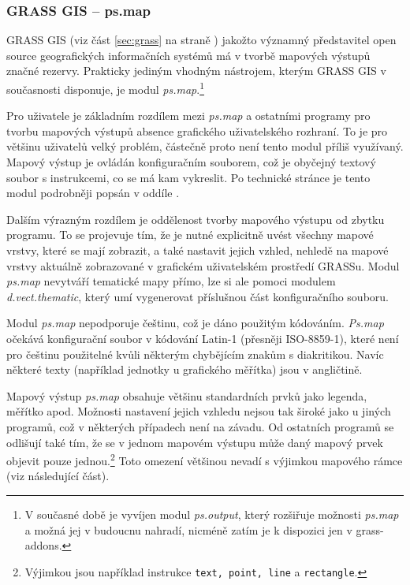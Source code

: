 \documentclass[a4paper,12pt,draft]{article}
\newcommand{\modul}[1]{\emph{#1}}
\newcommand{\instr}[1]{\lstinline[style=psmapInline]|#1|}
\begin{document}
\subsubsection{GRASS GIS -- ps.map}
\label{sec:porovnani:psmap}
GRASS GIS (viz část \ref{sec:grass} na straně \pageref{sec:grass})
jakožto významný představitel open source geografických informačních
systémů má v tvorbě mapových výstupů značné rezervy. Prakticky
jediným vhodným nástrojem, kterým GRASS GIS v současnosti disponuje,
je modul \modul{ps.map}.\footnote{V současné době je vyvíjen modul
\modul{ps.output}, který rozšiřuje možnosti \modul{ps.map} a možná
jej v budoucnu nahradí, nicméně zatím je k dispozici jen v grass-addons.}

Pro uživatele je základním rozdílem mezi \modul{ps.map} a ostatními
programy pro tvorbu mapových výstupů  absence grafického uživatelského
rozhraní. To je pro většinu uživatelů velký problém, částečně
proto není tento modul příliš využívaný. Mapový výstup je ovládán
konfiguračním souborem, což je obyčejný textový soubor s instrukcemi,
co se má kam vykreslit. Po technické stránce je tento modul podrobněji
popsán v oddíle .

Dalším výrazným rozdílem je oddělenost tvorby mapového výstupu od
zbytku programu. To se projevuje tím, že je nutné explicitně uvést
všechny mapové vrstvy, které se mají zobrazit, a také nastavit jejich
vzhled, nehledě na mapové vrstvy aktuálně zobrazované  v grafickém
uživatelském prostředí GRASSu. Modul \modul{ps.map} nevytváří
tematické mapy přímo, lze si ale pomoci modulem \emph{d.vect.thematic},
který umí vygenerovat příslušnou část konfiguračního souboru.

Modul \modul{ps.map} nepodporuje češtinu, což je dáno použitým
kódováním. \modul{Ps.map} očekává konfigurační soubor v kódování
Latin-1 (přesněji ISO-8859-1), které není pro češtinu použitelné
kvůli některým chybějícím znakům s diakritikou. Navíc některé texty
(například jednotky u grafického měřítka) jsou v angličtině.

Mapový výstup \modul{ps.map} obsahuje většinu standardních prvků jako
legenda, měřítko apod. Možnosti nastavení jejich vzhledu nejsou tak
široké jako u jiných programů, což v některých případech není na závadu. Od
ostatních programů se odlišují také tím, že se v jednom mapovém výstupu může
daný mapový prvek objevit pouze jednou.\footnote{Výjimkou jsou například
instrukce \instr{text, point, line} a \instr{rectangle}.} Toto omezení většinou
nevadí s výjimkou mapového rámce (viz následující část). 
\end{document}
